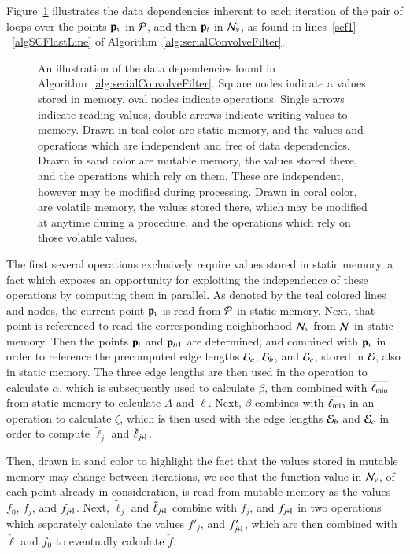 Figure~\ref{fig:sacfDataDependencies} illustrates the data dependencies inherent to each iteration of the pair of loops over the points $\mathbf{p}_v$ in $\mathcal{P}$, and then $\mathbf{p}_i$ in $\mathcal{N}_v$, as found in lines~\ref{scf1}~-~\ref{algSCFlastLine} of Algorithm~\ref{alg:serialConvolveFilter}.

\begin{figure}[ht]
	
	{\caption[Data Dependencies in Serial Algorithm~\ref{alg:serialConvolveFilter}: Calculate Edge Lengths]{An illustration of the data dependencies found in Algorithm~\ref{alg:serialConvolveFilter}. Square nodes indicate a values stored in memory, oval nodes indicate operations. Single arrows indicate reading values, double arrows indicate writing values to memory. Drawn in teal color are static memory, and the values and operations which are independent and free of data dependencies. Drawn in sand color are mutable memory, the values stored there, and the operations which rely on them. These are independent, however may be modified during processing. Drawn in coral color, are volatile memory, the values stored there, which may be modified at anytime during a procedure, and the operations which rely on those volatile values.}\label{fig:sacfDataDependencies}}
\end{figure}

The first several operations exclusively require values stored in static memory, a fact which exposes an opportunity for exploiting the independence of these operations by computing them in parallel. As denoted by the teal colored lines and nodes, the current point $\mathbf{p}_v$ is read from $\mathcal{P}$ in static memory. Next, that point is referenced to read the corresponding neighborhood $\mathcal{N}_v$ from $\mathcal{N}$ in static memory. Then the points $\mathbf{p}_i$ and $\bp_{\sipo}$ are determined, and combined with $\mathbf{p}_v$ in order to reference the precomputed edge lengths $\mathcal{E}_a$, $\mathcal{E}_b$, and $\mathcal{E}_c$, stored in $\mathcal{E}$, also in static memory. The three edge lengths are then used in the operation to calculate $\alpha$, which is subsequently used to calculate $\beta$, then combined with $\overline{\ell_\text{min}}$ from static memory to calculate $A$ and $\check{\ell}$. Next, $\beta$ combines with $\overline{\ell_\text{min}}$ in an operation to calculate $\zeta$, which is then used with the edge lengths $\mathcal{E}_b$ and $\mathcal{E}_c$ in order to compute $\tilde{\ell}_j$ and $\tilde{\ell}_{\sjpo}$.

Then, drawn in sand color to highlight the fact that the values stored in mutable memory may change between iterations, we see that the function value in $\mathcal{N}_v$, of each point already in consideration, is read from mutable memory as the values $f_0$, $f_j$, and $f_{\sjpo}$. Next, $\tilde{\ell}_j$ and $\tilde{\ell}_{\sjpo}$ combine with $f_j$, and $f_{\sjpo}$ in two operations which separately calculate the values $f'_j$, and $f'_{\sjpo}$, which are then combined with $\check{\ell}$ and $f_0$ to eventually calculate $\check{f}$.

